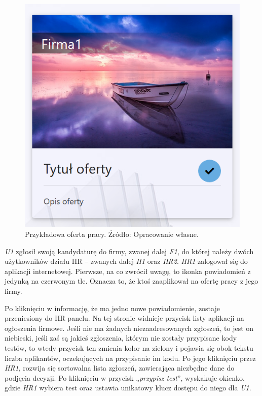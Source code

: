 \documentclass[twoside]{projektInzynierskiMS}
\numberwithin{figure}{section}
\begin{document}
\begin{figure}[h!]
    \centering
    \includegraphics[scale=0.5]{images/oferta.png}
    \caption{Przykładowa oferta pracy. Źródło: Opracowanie własne.}
    \label{fig:oferta_pracy}
\end{figure}

\textit{U1} zgłosił swoją kandydaturę do firmy, zwanej dalej \textit{F1}, do której należy dwóch użytkowników działu HR – zwanych dalej \textit{H1} oraz  \textit{HR2}. \textit{HR1} zalogował się do aplikacji internetowej. Pierwsze, na co zwrócił uwagę, to ikonka powiadomień z jedynką na czerwonym tle. Oznacza to, że ktoś zaaplikował na ofertę pracy z jego firmy.

Po kliknięciu w informację, że ma jedno nowe powiadomienie, zostaje przeniesiony do HR panelu. Na tej stronie widnieje przycisk listy aplikacji na ogłoszenia firmowe. Jeśli nie ma żadnych niezaadresowanych zgłoszeń, to jest on niebieski, jeśli zaś są jakieś zgłoszenia, którym nie zostały przypisane kody testów, to wtedy przycisk ten zmienia kolor na zielony i pojawia się obok tekstu liczba aplikantów, oczekujących na przypisanie im kodu. Po jego kliknięciu przez \textit{HR1}, rozwija się sortowalna lista zgłoszeń, zawierająca niezbędne dane do podjęcia decyzji. Po kliknięciu w przycisk „\textit{przypisz test}”, wyskakuje okienko, gdzie \textit{HR1} wybiera test oraz ustawia unikatowy klucz dostępu do niego dla \textit{U1}.
\end{document}
